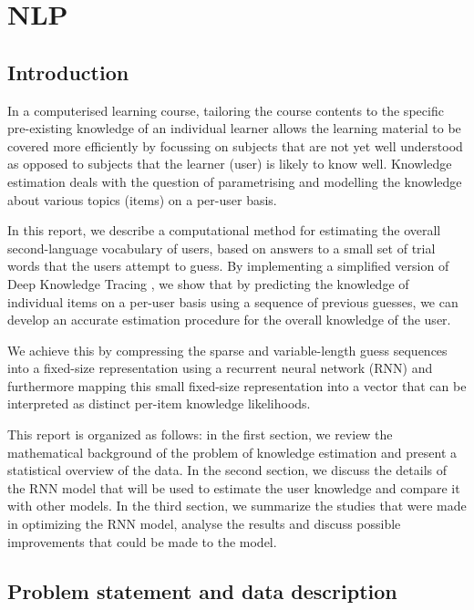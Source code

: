\section{NLP}
\subsection{Introduction}

In a computerised learning course, tailoring the course contents to the specific pre-existing knowledge of an individual learner allows the learning material to be covered more efficiently by focussing on subjects that are not yet well understood as opposed to subjects that the learner (user) is likely to know well. Knowledge estimation deals with the question of parametrising and modelling the knowledge about various topics (items) on a per-user basis. 

In this report, we describe a computational method for estimating the overall second-language vocabulary of users, based on answers to a small set of trial words that the users attempt to guess. By implementing a simplified version of Deep Knowledge Tracing \cite{DBLP:journals/corr/PiechSHGSGS15}, we show that by predicting the knowledge of individual items on a per-user basis using a sequence of previous guesses, we can develop an accurate estimation procedure for the overall knowledge of the user.

We achieve this by compressing the sparse and variable-length guess sequences into a fixed-size representation using a recurrent neural network (RNN) and furthermore mapping this small fixed-size representation into a vector that can be interpreted as distinct per-item knowledge likelihoods.

This report is organized as follows: in the first section, we review the mathematical background of the problem of knowledge estimation and present a statistical overview of the data. In the second section, we discuss the details of the RNN model that will be used to estimate the user knowledge and compare it with other models. In the third section, we summarize the studies that were made in optimizing the RNN model, analyse the results and discuss possible improvements that could be made to the model.

\subsection{Problem statement and data description}

